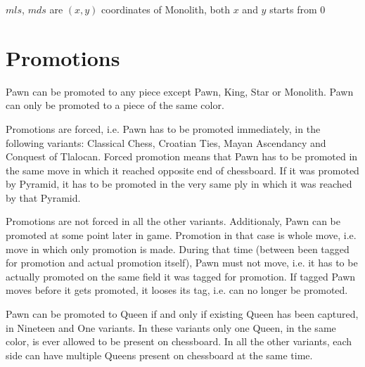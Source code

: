 $mls$, $mds$ are $(x, y)$ coordinates of Monolith, both $x$ and $y$ starts from $0$

\clearpage %

\section*{Promotions}
\label{sec:Definitions/Promotions}

Pawn can be promoted to any piece except Pawn, King, Star or Monolith.
Pawn can only be promoted to a piece of the same color.

Promotions are forced, i.e. Pawn has to be promoted immediately, in the following
variants: Classical Chess, Croatian Ties, Mayan Ascendancy and Conquest of Tlalocan.
Forced promotion means that Pawn has to be promoted in the same move in which it
reached opposite end of chessboard. If it was promoted by Pyramid, it has to be
promoted in the very same ply in which it was reached by that Pyramid.

Promotions are not forced in all the other variants. Additionaly, Pawn can be promoted
at some point later in game. Promotion in that case is whole move, i.e. move in which
only promotion is made. During that time (between been tagged for promotion and actual
promotion itself), Pawn must not move, i.e. it has to be actually promoted on the same
field it was tagged for promotion. If tagged Pawn moves before it gets promoted, it
looses its tag, i.e. can no longer be promoted.

Pawn can be promoted to Queen if and only if existing Queen has been captured, in
Nineteen and One variants. In these variants only one Queen, in the same color, is
ever allowed to be present on chessboard. In all the other variants, each side can
have multiple Queens present on chessboard at the same time.







\clearpage %
